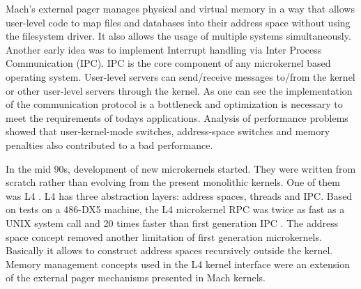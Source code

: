 \documentclass{acm_proc_article-sp}
\begin{document}
Mach's external pager \cite{p70liedtke} manages physical and virtual memory in a way that allows
user-level code to map files and databases into their address space without using the filesystem
driver.
It also allows the usage of multiple systems simultaneously.
Another early idea was to implement Interrupt handling via Inter Process Communication (IPC).
IPC is the core component of any microkernel based operating system.
User-level servers can send/receive messages to/from the kernel or other user-level servers
through the kernel.
As one can see the implementation of the communication protocol is a bottleneck and optimization
is necessary to meet the requirements of todays applications.
Analysis of performance problems \cite{p70liedtke} showed that user-kernel-mode switches, address-space
switches and memory penalties also contributed to a bad performance.

In the mid 90s, development of new microkernels started.
They were written from scratch rather than evolving from the present monolithic kernels.
One of them was L4 \cite{l4}.
L4 has three abstraction layers: address spaces, threads and IPC.
Based on tests on a 486-DX5 machine, the L4 microkernel RPC was twice as fast as a UNIX system call
and 20 times faster than first generation IPC \cite{p70liedtke}.
The address space concept removed another limitation of first generation microkernels.
Basically it allows to construct address spaces recursively outside the kernel.
Memory management concepts used in the L4 kernel interface were an extension of the external
pager mechanisms presented in Mach kernels.
\end{document}
